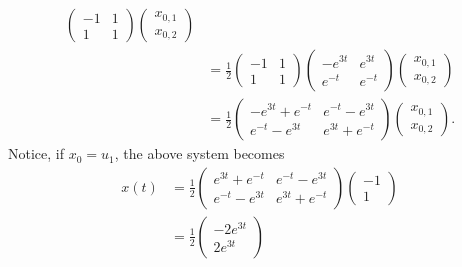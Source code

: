 \documentclass{article}
\begin{document}
\begin{itemize}
\begin{itemize}
\begin{align*}
\begin{pmatrix}
                -1 & 1\\
                1 & 1
            \end{pmatrix}\begin{pmatrix}
                x_{0,1}\\
                x_{0,2}
            \end{pmatrix}\\
            &= \frac{1}{2}\begin{pmatrix}
                -1 & 1\\
                1 & 1
            \end{pmatrix}\begin{pmatrix}
                -e^{3t} & e^{3t}\\
                e^{-t} & e^{-t}
            \end{pmatrix}\begin{pmatrix}
                x_{0,1}\\
                x_{0,2}
            \end{pmatrix}\\
            &= \frac{1}{2}\begin{pmatrix}
                -e^{3t} + e^{-t} & e^{-t} - e^{3t}\\
                e^{-t} - e^{3t} & e^{3t} + e^{-t}
            \end{pmatrix}\begin{pmatrix}
                x_{0,1}\\
                x_{0,2}
            \end{pmatrix}.
        \end{align*}
        Notice, if $x_0 = u_1$, the above system becomes
        \begin{align*}
            x(t) &= \frac{1}{2}\begin{pmatrix}
                e^{3t} + e^{-t} & e^{-t} - e^{3t}\\
                e^{-t} - e^{3t} & e^{3t} + e^{-t}
            \end{pmatrix}\begin{pmatrix}
                -1\\
                1
            \end{pmatrix}\\
            &= \frac{1}{2}\begin{pmatrix}
                -2e^{3t}\\
                2e^{3t}
            \end{pmatrix}\\

\end{align*}
\end{itemize}
\end{itemize}
\end{document}
